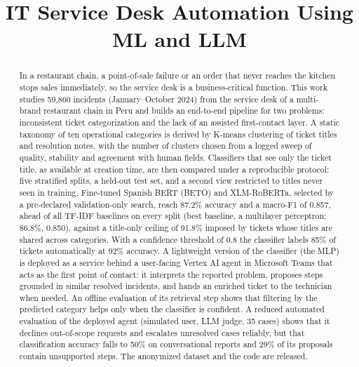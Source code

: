 \documentclass[conference]{IEEEtran}
\begin{document}
\title{IT Service Desk Automation Using ML and LLM}

\author{
\and
{}
}

\maketitle

\begin{abstract}
In a restaurant chain, a point-of-sale failure or an order that never reaches the kitchen stops sales
immediately, so the service desk is a business-critical function. This work studies 59,860 incidents
(January--October 2024) from the service desk of a multi-brand restaurant chain in Peru and builds an
end-to-end pipeline for two problems: inconsistent ticket categorization and the lack of an assisted
first-contact layer. A static taxonomy of ten operational categories is derived by K-means clustering of
ticket titles and resolution notes, with the number of clusters chosen from a logged sweep of quality,
stability and agreement with human fields. Classifiers that see only the ticket title, as available at
creation time, are then compared under a reproducible protocol: five stratified splits, a held-out test
set, and a second view restricted to titles never seen in training. Fine-tuned Spanish BERT (BETO) and
XLM-RoBERTa, selected by a pre-declared validation-only search, reach 87.2\% accuracy and a macro-F1 of
0.857, ahead of all TF-IDF baselines on every split (best baseline, a multilayer perceptron: 86.8\%,
0.850), against a title-only ceiling of 91.8\% imposed by tickets whose titles are shared across
categories. With a confidence threshold of 0.8 the classifier labels 85\% of tickets automatically at
92\% accuracy. A lightweight version of the classifier (the MLP) is deployed as a service behind a user-facing Vertex AI agent in
Microsoft Teams that acts as the first point of contact: it interprets the reported problem, proposes steps
grounded in similar resolved incidents, and hands an enriched ticket to the technician when needed. An offline
evaluation of its retrieval step shows that filtering by the predicted category helps only when the classifier
is confident. A reduced automated evaluation of the deployed agent (simulated user, LLM judge, 35 cases) shows
that it declines out-of-scope requests and escalates unresolved cases reliably, but that classification accuracy
falls to 50\% on conversational reports and 29\% of its proposals contain unsupported steps. The anonymized
dataset and the code are released.
\end{abstract}
\end{document}
